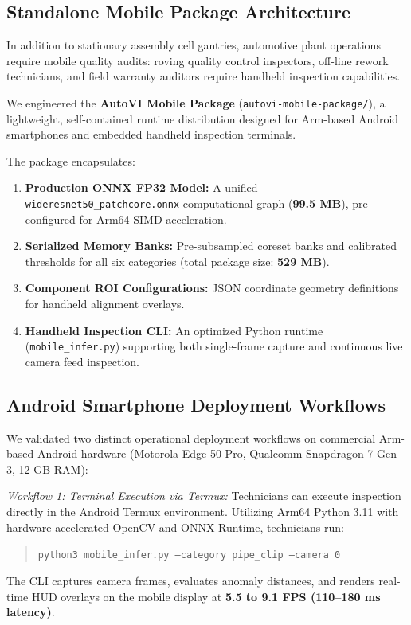 \documentclass[journal,twocolumn]{IEEEtran}
\begin{document}
\subsection{Standalone Mobile Package Architecture}
In addition to stationary assembly cell gantries, automotive plant operations require mobile quality audits: roving quality control inspectors, off-line rework technicians, and field warranty auditors require handheld inspection capabilities.

We engineered the \textbf{AutoVI Mobile Package} (\texttt{autovi-mobile-package/}), a lightweight, self-contained runtime distribution designed for Arm-based Android smartphones and embedded handheld inspection terminals.

The package encapsulates:
\begin{enumerate}
    \item \textbf{Production ONNX FP32 Model:} A unified \texttt{wideresnet50\_patchcore.onnx} computational graph (\textbf{99.5 MB}), pre-configured for Arm64 SIMD acceleration.
    \item \textbf{Serialized Memory Banks:} Pre-subsampled coreset banks and calibrated thresholds for all six categories (total package size: \textbf{529 MB}).
    \item \textbf{Component ROI Configurations:} JSON coordinate geometry definitions for handheld alignment overlays.
    \item \textbf{Handheld Inspection CLI:} An optimized Python runtime (\texttt{mobile\_infer.py}) supporting both single-frame capture and continuous live camera feed inspection.
\end{enumerate}

\subsection{Android Smartphone Deployment Workflows}
We validated two distinct operational deployment workflows on commercial Arm-based Android hardware (Motorola Edge 50 Pro, Qualcomm Snapdragon 7 Gen 3, 12 GB RAM):

\textit{Workflow 1: Terminal Execution via Termux:} Technicians can execute inspection directly in the Android Termux environment. Utilizing Arm64 Python 3.11 with hardware-accelerated OpenCV and ONNX Runtime, technicians run:
\begin{quote}
\texttt{python3 mobile\_infer.py --category pipe\_clip --camera 0}
\end{quote}
The CLI captures camera frames, evaluates anomaly distances, and renders real-time HUD overlays on the mobile display at \textbf{5.5 to 9.1 FPS (110--180 ms latency)}.
\end{document}

